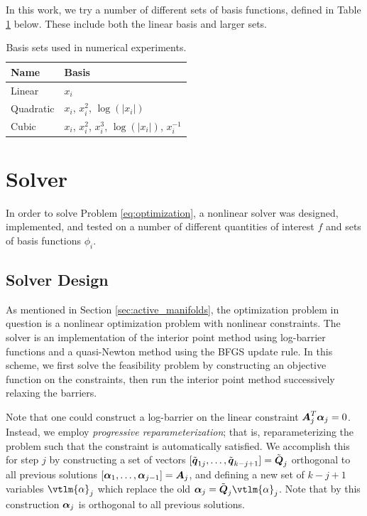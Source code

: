 \documentclass[]{aiaa-tc}%
\begin{document}
In this work, we try a number of different sets of basis functions, defined in Table \ref{tab:basis} below. These include both the linear basis and larger sets.

\begin{table}
\centering
\begin{tabular}{ll}
\toprule
Name & Basis \\
\midrule
Linear & $x_i$ \\
Quadratic & $x_i$, $x_i^2$, $\log(|x_i|)$ \\
Cubic & $x_i$, $x_i^2$, $x_i^3$, $\log(|x_i|)$, $x_i^{-1}$ \\
\bottomrule
\end{tabular}
\caption{Basis sets used in numerical experiments.}
\label{tab:basis}
\end{table}

\section{Solver} \label{sec:solver}
In order to solve Problem \ref{eq:optimization}, a nonlinear solver was designed, implemented, and tested on a number of different quantities of interest $f$ and sets of basis functions $\phi_i$.

\subsection{Solver Design} \label{sec:solver_design}
As mentioned in Section \ref{sec:active_manifolds}, the optimization problem in question is a nonlinear optimization problem with nonlinear constraints. The solver is an implementation of the interior point method using log-barrier functions and a quasi-Newton method using the BFGS update rule.\cite{Chandrupatla1999} In this scheme, we first solve the feasibility problem by constructing an objective function on the constraints, then run the interior point method successively relaxing the barriers.

Note that one could construct a log-barrier on the linear constraint $\boldsymbol{A}^T_j\boldsymbol{\alpha}_j=0$. Instead, we employ \emph{progressive reparameterization}; that is, reparameterizing the problem such that the constraint is automatically satisfied. We accomplish this for step $j$ by constructing a set of vectors $[\tilde{\boldsymbol{q}}_{1j},\dots,\tilde{\boldsymbol{q}}_{k-j+1}]=\tilde{\boldsymbol{Q}}_j$ orthogonal to all previous solutions $[\boldsymbol{\alpha}_1,\dots,\boldsymbol{\alpha}_{j-1}]=\boldsymbol{A}_j$, and defining a new set of $k-j+1$ variables $\vtlm{\alpha}_j$ which replace the old $\vsym{\alpha}_j=\tilde{\mQ}_j\vtlm{\alpha}_j$. Note that by this construction $\boldsymbol{\alpha}_j$ is orthogonal to all previous solutions.
\end{document}
